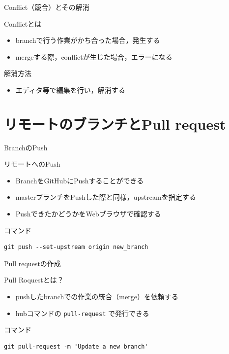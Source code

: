 \documentclass[t, aspectratio=169]{beamer}
\begin{document}
\begin{frame}[label=sec-3-1-4]{Conflict（競合）とその解消}
\begin{block}{Conflictとは}
\begin{itemize}
\item branchで行う作業がかち合った場合，発生する
\item mergeする際，conflictが生じた場合，エラーになる
\end{itemize}
\end{block}
\begin{block}{解消方法}
\begin{itemize}
\item エディタ等で編集を行い，解消する
\end{itemize}
\end{block}
\end{frame}

\section{リモートのブランチとPull request}
\label{sec-3-2}
\begin{frame}[fragile,label=sec-3-2-1]{BranchのPush}
 \begin{block}{リモートへのPush}
\begin{itemize}
\item BranchをGitHubにPushすることができる
\item masterブランチをPushした際と同様，upstreamを指定する
\item PushできたかどうかをWebブラウザで確認する
\end{itemize}
\end{block}

\begin{block}{コマンド}
\begin{verbatim}
git push --set-upstream origin new_branch
\end{verbatim}
\end{block}
\end{frame}

\begin{frame}[fragile,label=sec-3-2-2]{Pull requestの作成}
 \begin{block}{Pull Roquestとは？}
\begin{itemize}
\item pushしたbranchでの作業の統合（merge）を依頼する
\item hubコマンドの \texttt{pull-request} で発行できる
\end{itemize}
\end{block}

\begin{block}{コマンド}
\begin{verbatim}
git pull-request -m 'Update a new branch'
\end{verbatim}
\end{block}
\end{frame}
\end{document}
